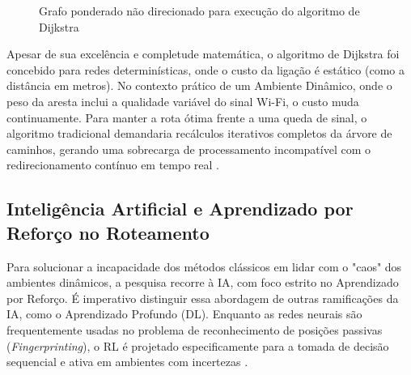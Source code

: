 \documentclass[
    12pt,                %
    openright,           %
    oneside,             %
    a4paper,             %
    english,             %
    brazil               %
]{abntex2}
\begin{document}
\begin{figure}[H]
\centering
\caption{Grafo ponderado não direcionado para execução do algoritmo de Dijkstra}
\label{fig:grafo-dijkstra}
\end{figure}

Apesar de sua excelência e completude matemática, o algoritmo de Dijkstra foi
concebido para redes determinísticas, onde o custo da ligação é estático (como
a distância em metros). No contexto prático de um Ambiente Dinâmico, onde
o peso da aresta inclui a qualidade variável do sinal Wi-Fi, o custo muda
continuamente. Para manter a rota ótima frente a uma queda de sinal, o algoritmo
tradicional demandaria recálculos iterativos completos da árvore de caminhos,
gerando uma sobrecarga de processamento incompatível com o redirecionamento
contínuo em tempo real \cite{Pham2025}.

\subsection{Inteligência Artificial e Aprendizado por Reforço no Roteamento}

Para solucionar a incapacidade dos métodos clássicos em lidar com o "caos" dos ambientes dinâmicos, a pesquisa recorre à IA, com foco estrito no Aprendizado por Reforço. É imperativo distinguir essa abordagem de outras ramificações da IA, como o Aprendizado Profundo (DL). Enquanto as redes neurais são frequentemente usadas no problema de reconhecimento de posições passivas (\textit{Fingerprinting}), o RL é projetado especificamente para a tomada de decisão sequencial e ativa em ambientes com incertezas \cite{Sutton2018}.
\end{document}
